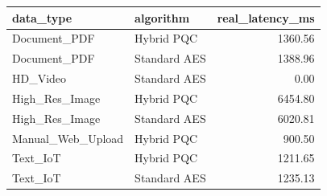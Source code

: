 \begin{tabular}{llr}
\toprule
data_type & algorithm & real_latency_ms \\
\midrule
Document_PDF & Hybrid PQC & 1360.56 \\
Document_PDF & Standard AES & 1388.96 \\
HD_Video & Standard AES & 0.00 \\
High_Res_Image & Hybrid PQC & 6454.80 \\
High_Res_Image & Standard AES & 6020.81 \\
Manual_Web_Upload & Hybrid PQC & 900.50 \\
Text_IoT & Hybrid PQC & 1211.65 \\
Text_IoT & Standard AES & 1235.13 \\
\bottomrule
\end{tabular}
